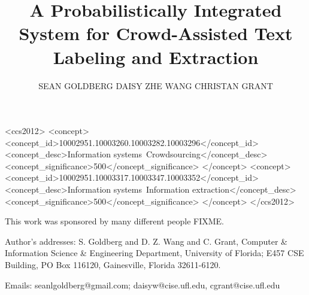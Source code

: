 \documentclass[prodmode,acmjdiq]{acmsmall}
\begin{document}

\title{A Probabilistically Integrated System for Crowd-Assisted Text Labeling and Extraction}



\author{SEAN GOLDBERG
DAISY ZHE WANG
CHRISTAN GRANT
}









\begin{CCSXML}
<ccs2012>
<concept>
<concept_id>10002951.10003260.10003282.10003296</concept_id>
<concept_desc>Information systems~Crowdsourcing</concept_desc>
<concept_significance>500</concept_significance>
</concept>
<concept>
<concept_id>10002951.10003317.10003347.10003352</concept_id>
<concept_desc>Information systems~Information extraction</concept_desc>
<concept_significance>500</concept_significance>
</concept>
</ccs2012>
\end{CCSXML}




\begin{bottomstuff}
This work was sponsored by many different people FIXME.

Author's addresses: S. Goldberg {and} D. Z. Wang {and} C. Grant,
Computer \& Information Science \& Engineering Department, University of Florida;
E457 CSE Building, PO Box 116120, Gainesville, Florida 32611-6120.

Emails: seanlgoldberg@gmail.com; daisyw@cise.ufl.edu, cgrant@cise.ufl.edu
\end{bottomstuff}
\end{document}
